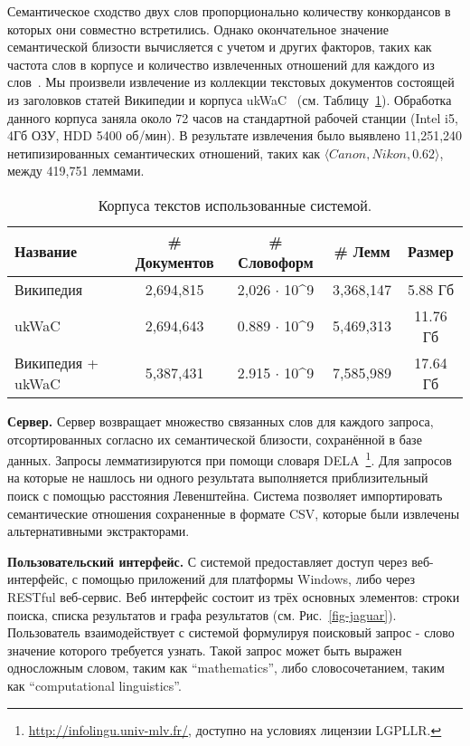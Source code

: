 \documentclass[a4paper,10pt,twoside]{article}
\begin{document}
Семантическое сходство двух слов пропорционально количеству конкордансов в которых они совместно встретились. Однако окончательное значение семантической близости вычисляется с учетом и других факторов, таких как частота слов в корпусе и количество извлеченных отношений для каждого из слов~\cite{panchenko2012konvens}. Мы произвели извлечение из коллекции текстовых документов состоящей из заголовков статей Википедии и корпуса ukWaC~\cite{baroni2009wacky} (см. Таблицу~\ref{tbl:corpora}). Обработка данного корпуса заняла около 72 часов на стандартной рабочей станции (Intel i5, 4Гб ОЗУ, HDD 5400 об/мин). В результате извлечения было выявлено 11,251,240 нетипизированных семантических отношений, таких как  $\langle Canon, Nikon, 0.62 \rangle$, между 419,751 леммами. 

\begin{table}
\centering
\footnotesize
\begin{tabular}{|l|c|c|c|c|}
  \hline              
  Название & \# Документов & \# Словоформ & \# Лемм &  Размер \\ \hline         \hline           
  Википедия & 2,694,815 & 2,026 $\cdot$ 10^9 & 3,368,147 & 5.88 Гб \\
  ukWaC & 2,694,643 & 0.889 $\cdot$ 10^9 & 5,469,313 & 11.76 Гб \\ 
  Википедия + ukWaC & 5,387,431 & 2.915 $\cdot$ 10^9 & 7,585,989 & 17.64 Гб\\
  \hline  
\end{tabular}
\caption{Корпуса текстов использованные системой.}
\label{tbl:corpora}
\end{table}

\textbf{Сервер.} Сервер возвращает множество связанных слов для каждого запроса, отсортированных согласно их семантической близости, сохранённой в базе данных. Запросы лемматизируются при помощи словаря DELA~\footnote{\url{http://infolingu.univ-mlv.fr/}, доступно на условиях лицензии LGPLLR.}. Для запросов на которые не нашлось ни одного результата выполняется приблизительный поиск с помощью расстояния Левенштейна. Система позволяет импортировать семантические отношения сохраненные в формате CSV, которые были извлечены альтернативными экстракторами.

\textbf{Пользовательский интерфейс.} С системой предоставляет доступ через веб-интерфейс, с помощью приложений для платформы Windows, либо через RESTful веб-сервис. Веб интерфейс состоит из трёх основных элементов: строки поиска, списка результатов и графа результатов (см. Рис.~\ref{fig-jaguar}). Пользователь взаимодействует с системой формулируя поисковый запрос - слово значение которого требуется узнать. Такой запрос может быть выражен односложным словом, таким как ``mathematics'', либо словосочетанием, таким как ``computational linguistics''. 
\end{document}
